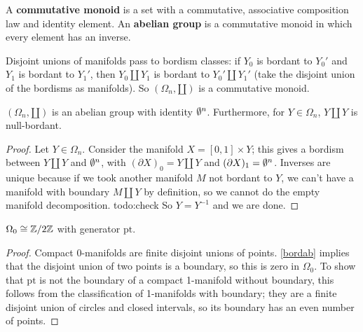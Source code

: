 \begin{definition}[]
    A \textbf{commutative monoid} is a set with a commutative, associative composition law and identity element. An \textbf{abelian group} is a commutative monoid in which every element has an inverse.
\end{definition}
Disjoint unions of manifolds pass to bordism classes: if $Y_0$ is bordant to $Y_0'$ and $Y_1$ is bordant to $Y_1'$, then $Y_0\amalg Y_1$ is bordant to $Y_0'\amalg Y_1'$ (take the disjoint union of the bordisms as manifolds). So $(\Omega_n ,\amalg)$ is a commutative monoid.
\begin{lemma}\label{bordab} 
    $(\Omega_n,\amalg )$ is an abelian group with identity $\emptyset^n $. Furthermore, for $Y \in \Omega_n $, $Y\amalg Y$ is null-bordant.
\end{lemma}
\begin{proof}
    Let $Y \in  \Omega_n $. Consider the manifold $X=[0,1] \times Y$; this gives a bordism between $Y\amalg Y$ and $\emptyset^n $, with $(\partial X)_0=Y\amalg Y $ and $(\partial X)_1=\emptyset^n $. Inverses are unique because if we took another manifold $M$ not bordant to $Y$, we can't have a manifold with boundary $M\amalg Y$ by definition, so we cannot do the empty manifold decomposition. {\color{red}todo:check} 
    So $Y=Y^{-1}$ and we are done.
\end{proof}
\begin{prop}
    $\Omega_0 \cong \mathbb{Z} /2\mathbb{Z}$ with generator $\mathrm{pt} $.
\end{prop}
\begin{proof}
    Compact 0-manifolds are finite disjoint unions of points. \cref{bordab} implies that the disjoint union of two points is a boundary, so this is zero in $\Omega_0$. To show that $\mathrm{pt}$ is not the boundary of a compact 1-manifold without boundary, this follows from the classification of 1-manifolds with boundary; they are a finite disjoint union of circles and closed intervals, so its boundary has an even number of points.
\end{proof}

